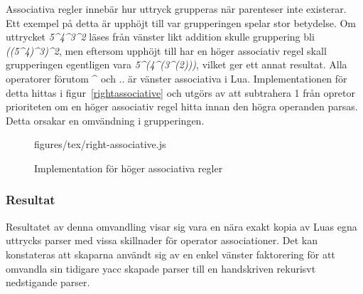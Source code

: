 Associativa regler innebär hur uttryck grupperas när parenteser inte
existerar. Ett exempel på detta är upphöjt till var grupperingen spelar stor
betydelse. Om uttrycket \textit{5\^{}4\^{}3\^{}2} läses från vänster likt
addition skulle gruppering bli \textit{((5\^{}4)\^{}3)\^{}2}, men eftersom
upphöjt till har en höger associativ regel skall grupperingen egentligen vara
\textit{5\^{}(4\^{}(3\^{}(2)))}, vilket ger ett annat resultat. Alla
operatorer förutom \^{} och .. är vänster associativa i Lua. Implementationen
för detta hittas i figur~\ref{rightassociative} och utgörs av att subtrahera
1 från opretor prioriteten om en höger associativ regel hitta innan den
högra operanden parsas. Detta orsakar en omvändning i grupperingen.

\begin{figure}[ht]
    {figures/tex/right-associative.js}
  \caption{Implementation för höger associativa regler}
  \label{fig:rightassociative}
\end{figure}

\subsubsection{Resultat}

Resultatet av denna omvandling visar sig vara en nära exakt kopia av Luas egna
uttrycks parser med vissa skillnader för operator associationer. Det kan
konstateras att skaparna användt sig av en enkel vänster faktorering för att
omvandla sin tidigare yacc skapade parser till en handskriven rekurisvt
nedstigande parser.

%
%
%

%
%

